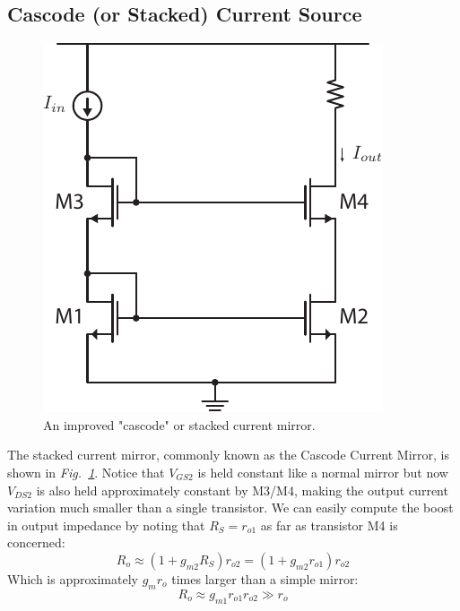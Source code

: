 \subsection{Cascode (or Stacked) Current Source}
\begin{figure}[tb]
\centering
\includegraphics[scale=1]{12mirror_cascode.pdf}
\caption{An improved "cascode" or stacked current mirror.}
\label{fig:12mirror_cascode.pdf}
\end{figure}
The stacked current mirror, commonly known as the Cascode Current Mirror, is shown in \emph{Fig.~\ref{fig:12mirror_cascode.pdf}}.  Notice that $V_{GS2}$ is held constant like a normal mirror but now $V_{DS2}$ is also held  approximately constant by M3/M4, making the output current variation much smaller than a single transistor. 
We can easily compute the boost in output impedance by noting that $R_S = r_{o1}$ as far as transistor M4 is concerned: 
    \begin{equation}
        {R_o} \approx \left( {1 + {g_{m2}}{R_S}} \right){r_{o2}} = \left( {1 + {g_{m2}}{r_{o1}}} \right){r_{o2}}
    \end{equation}
Which is approximately $g_m r_o$ times larger than a simple mirror:
    \begin{equation}
        {R_o} \approx {g_{m1}}r_{o1} r_{o2} \gg {r_o}
    \end{equation}
